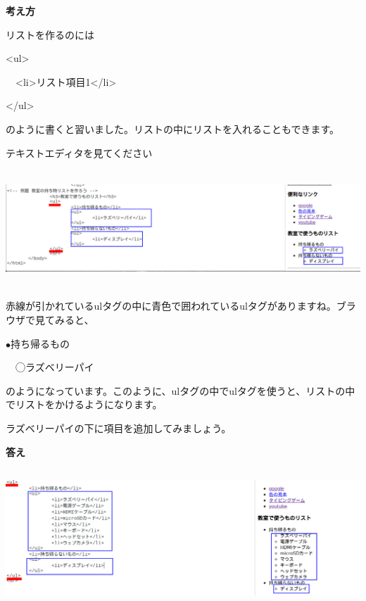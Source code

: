 \documentclass[a4paper,12pt]{jarticle}
\begin{document}
\bigskip
\flushleft

\textbf{考え方}



リストを作るのには

{\textless}ul{\textgreater}

\ \ {\textless}li{\textgreater}リスト項目1{\textless}/li{\textgreater}

{\textless}/ul{\textgreater}

のように書くと習いました。リストの中にリストを入れることもできます。

テキストエディタを見てください

\bigskip

\centering
\includegraphics[width=15.519cm,height=4.383cm]{textbook-img204.png}

\bigskip
\flushleft

赤線が引かれているulタグの中に青色で囲われているulタグがありますね。ブラウザで見てみると、

${\bullet}持ち帰るもの$

\ \ ◯ラズベリーパイ

のようになっています。このように、ulタグの中でulタグを使うと、リストの中でリストをかけるようになります。

ラズベリーパイの下に項目を追加してみましょう。


\bigskip


\clearpage\flushleft
\textbf{答え}


\bigskip

\centering
\includegraphics[width=15.937cm,height=5.186cm]{textbook-img205.png}
\end{document}
